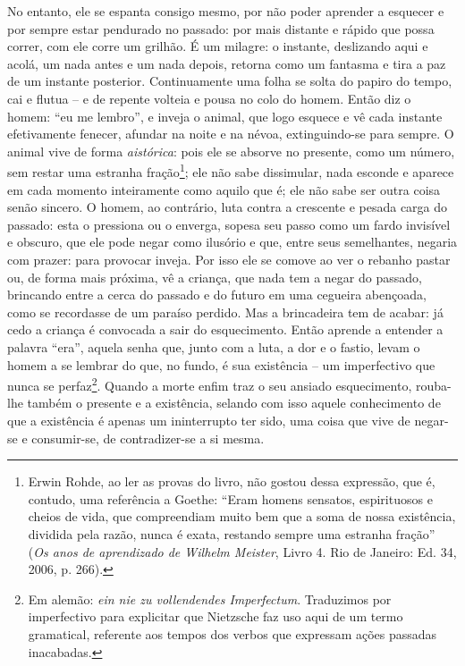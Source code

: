 No entanto, ele se espanta consigo mesmo, por não poder aprender a
esquecer e por sempre estar pendurado no passado: por mais distante e
rápido que possa correr, com ele corre um grilhão. É um milagre: o
instante, deslizando aqui e acolá, um nada antes e um nada depois,
retorna como um fantasma e tira a paz de um instante posterior.
Continuamente uma folha se solta do papiro do tempo, cai e flutua -- e
de repente volteia e pousa no colo do homem. Então diz o homem: ``eu me
lembro'', e inveja o animal, que logo esquece e vê cada instante
efetivamente fenecer, afundar na noite e na névoa, extinguindo-se para
sempre. O animal vive de forma \emph{aistórica}: pois ele se absorve no
presente, como um número, sem restar uma estranha fração\footnote{Erwin
  Rohde, ao ler as provas do livro, não gostou dessa expressão, que é,
  contudo, uma referência a Goethe: ``Eram homens sensatos, espirituosos
  e cheios de vida, que compreendiam muito bem que a soma de nossa
  existência, dividida pela razão, nunca é exata, restando sempre uma
  estranha fração'' (\emph{Os anos de aprendizado de Wilhelm Meister},
  Livro 4. Rio de Janeiro: Ed. 34, 2006, p. 266).}; ele não sabe
dissimular, nada esconde e aparece em cada momento inteiramente como
aquilo que é; ele não sabe ser outra coisa senão sincero. O homem, ao
contrário, luta contra a crescente e pesada carga do passado: esta o
pressiona ou o enverga, sopesa seu passo como um fardo invisível e
obscuro, que ele pode negar como ilusório e que, entre seus semelhantes,
negaria com prazer: para provocar inveja. Por isso ele se comove ao ver
o rebanho pastar ou, de forma mais próxima, vê a criança, que nada tem a
negar do passado, brincando entre a cerca do passado e do futuro em uma
cegueira abençoada, como se recordasse de um paraíso perdido. Mas a
brincadeira tem de acabar: já cedo a criança é convocada a sair do
esquecimento. Então aprende a entender a palavra ``era'', aquela senha
que, junto com a luta, a dor e o fastio, levam o homem a se lembrar do
que, no fundo, é sua existência -- um imperfectivo que nunca se
perfaz\footnote{Em alemão: \emph{ein nie zu vollendendes Imperfectum}.
  Traduzimos por imperfectivo para explicitar que Nietzsche faz uso aqui
  de um termo gramatical, referente aos tempos dos verbos que expressam
  ações passadas inacabadas.}. Quando a morte enfim traz o seu ansiado
esquecimento, rouba-lhe também o presente e a existência, selando com
isso aquele conhecimento de que a existência é apenas um ininterrupto
ter sido, uma coisa que vive de negar-se e consumir-se, de
contradizer-se a si mesma.

